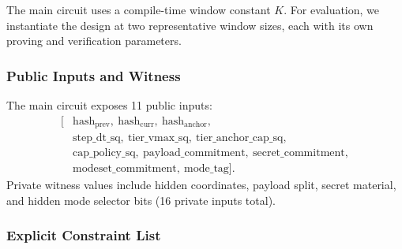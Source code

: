 \documentclass[conference]{IEEEtran}
\theoremstyle{definition}
\theoremstyle{plain}
\begin{document}
The main circuit uses a compile-time window
constant $K$. For evaluation, we instantiate the design at two
representative window sizes, each with its own proving and verification
parameters.

\subsubsection{Public Inputs and Witness}

The main circuit exposes 11 public inputs:
\[
\begin{aligned}
[
&\mathrm{hash}_{\mathrm{prev}},\ \mathrm{hash}_{\mathrm{curr}},\ \mathrm{hash}_{\mathrm{anchor}},\\
&\mathrm{step\_dt\_sq},\ \mathrm{tier\_vmax\_sq},\ \mathrm{tier\_anchor\_cap\_sq},\\
&\mathrm{cap\_policy\_sq},\ \mathrm{payload\_commitment},\ \mathrm{secret\_commitment},\\
&\mathrm{modeset\_commitment},\ \mathrm{mode\_tag}
].
\end{aligned}
\]
Private witness values include hidden coordinates, payload split,
secret material, and hidden mode selector bits (16 private inputs total).

\subsubsection{Explicit Constraint List}
\end{document}
